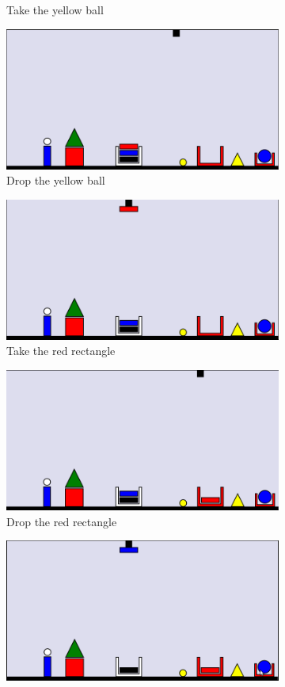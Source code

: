 \begin{figure}[p]
\begin{subfigure}{.5\textwidth}
  \caption{Take the yellow ball}
  \label{fig:4}
\end{subfigure}
\begin{subfigure}{.5\textwidth}
  \centering
  \includegraphics[width=.7\linewidth]{fig/5.png}
  \caption{Drop the yellow ball}
  \label{fig:5}
\end{subfigure}%
\begin{subfigure}{.5\textwidth}
  \centering
  \includegraphics[width=.7\linewidth]{fig/6.png}
  \caption{Take the red rectangle}
  \label{fig:6}
\end{subfigure}
\begin{subfigure}{.5\textwidth}
  \centering
  \includegraphics[width=.7\linewidth]{fig/7.png}
  \caption{Drop the red rectangle}
  \label{fig:7}
\end{subfigure}%
\begin{subfigure}{.5\textwidth}
  \centering
  \includegraphics[width=.7\linewidth]{fig/8.png}

\end{subfigure}
\end{figure}
